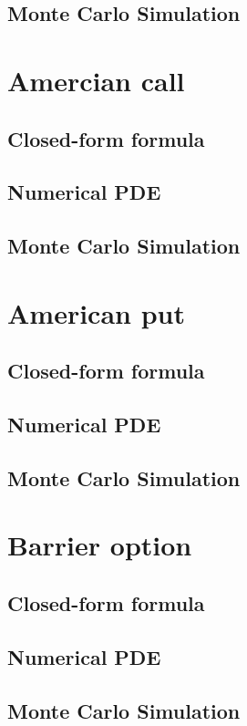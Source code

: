 \subsection{Monte Carlo Simulation}
\newpage

\section{Amercian call}

\subsection{Closed-form formula}
\newpage
\subsection{Numerical PDE}
\newpage
\subsection{Monte Carlo Simulation}
\newpage

\section{American put}

\subsection{Closed-form formula}
\newpage
\subsection{Numerical PDE}
\newpage
\subsection{Monte Carlo Simulation}
\newpage

\section{Barrier option}

\subsection{Closed-form formula}
\newpage
\subsection{Numerical PDE}
\newpage
\subsection{Monte Carlo Simulation}
\newpage

